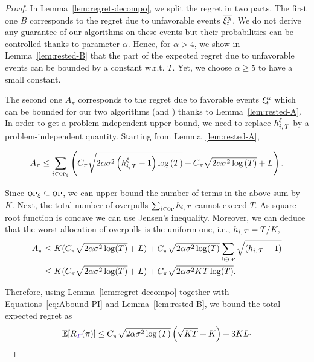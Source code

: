 \begin{proof}
In Lemma~\ref{lem:regret-decompo}, we split the regret in two parts. The first one $B$ corresponds to the regret due to unfavorable events $\overline{\xi^\alpha_t}$. We do not derive any guarantee of our algorithms on these events but their probabilities can be controlled thanks to parameter $\alpha$. Hence, for $\alpha > 4$, we show in Lemma~\ref{lem:rested-B} that the part of the expected regret due to unfavorable events can be bounded by a constant w.r.t. $T$. Yet, we choose $\alpha \geq 5$ to have a small constant.

The second one $A_\pi$ corresponds to the regret due to favorable events $\xi^\alpha_t$ which can be bounded for our two algorithms (\FEWA and \RUCB) thanks to Lemma~\ref{lem:rested-A}. In order to get a problem-independent upper bound, we need to replace $h_{i,\,T}^\xi$ by a problem-independent quantity. Starting from Lemma~\ref{lem:rested-A},

\begin{equation*}
A_{\pi} \leq \sum_{i\in \textsc{op}_\xi} \left(C_\pi\sqrt{2\alpha\sigma^2\left(h_{i,\,T}^\xi -1\right)\log\left(T\right)} +C_\pi\sqrt{2\alpha\sigma^2\log{\left(T\right)}}+  L\right).
\end{equation*}

Since $\textsc{op}_\xi \subseteq \textsc{op}$, we can upper-bound the number of terms in the above sum by  $K$.
Next, the total number of overpulls $\sum_{i\in\textsc{op}} h_{i,\,T}$ cannot exceed $T$. 
As square-root function is concave we can use Jensen's inequality. 
Moreover, we can deduce that the worst allocation of overpulls is the uniform one, i.e., $h_{i,\,T} = T/K,$
\begin{align}
A_{\pi} &\leq K(C_\pi\sqrt{2\alpha\sigma^2\log(T)} + L) + C_\pi\sqrt{2\alpha\sigma^2\log(T)} \sum_{i\in \textsc{op}} \sqrt{(h_{i,\,T} - 1)}\nonumber\\ 
&\leq K (C_\pi\sqrt{2\alpha\sigma^2\log(T)} + L) + C_\pi\sqrt{2\alpha\sigma^2KT\log(T)}.
\label{eq:Abound-PI}
\end{align}

Therefore, using Lemma~\ref{lem:regret-decompo} together with Equations~\ref{eq:Abound-PI} and Lemma~\ref{lem:rested-B}, we bound the total expected regret as
\begin{equation}
\mathbb{E}[\regret(\pi)] \leq C_\pi\sqrt{2\alpha\sigma^2\log\pa{T}}\pa{\sqrt{KT} +K} + 3KL\cdot
\end{equation}
\end{proof}

